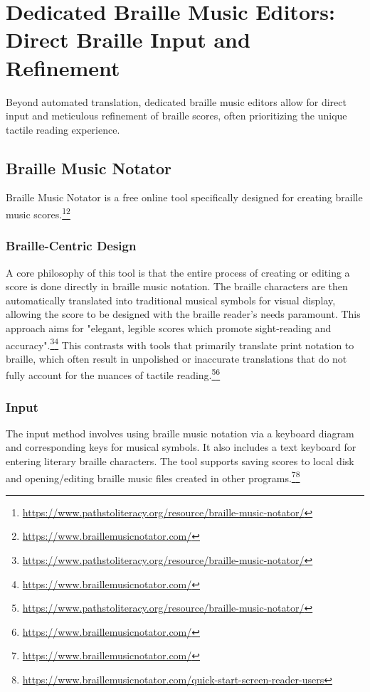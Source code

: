 \section{Dedicated Braille Music Editors: Direct Braille Input and Refinement}

Beyond automated translation, dedicated braille music editors allow for direct input and meticulous refinement of braille scores, often prioritizing the unique tactile reading experience.

\subsection{Braille Music Notator}
Braille Music Notator is a free online tool specifically designed for creating braille music scores.\footnote{\url{https://www.pathstoliteracy.org/resource/braille-music-notator/}}\footnote{\url{https://www.braillemusicnotator.com/}}

\subsubsection{Braille-Centric Design}
A core philosophy of this tool is that the entire process of creating or editing a score is done directly in braille music notation. The braille characters are then automatically translated into traditional musical symbols for visual display, allowing the score to be designed with the braille reader's needs paramount. This approach aims for "elegant, legible scores which promote sight-reading and accuracy".\footnote{\url{https://www.pathstoliteracy.org/resource/braille-music-notator/}}\footnote{\url{https://www.braillemusicnotator.com/}} This contrasts with tools that primarily translate print notation to braille, which often result in unpolished or inaccurate translations that do not fully account for the nuances of tactile reading.\footnote{\url{https://www.pathstoliteracy.org/resource/braille-music-notator/}}\footnote{\url{https://www.braillemusicnotator.com/}}

\subsubsection{Input}
The input method involves using braille music notation via a keyboard diagram and corresponding keys for musical symbols. It also includes a text keyboard for entering literary braille characters. The tool supports saving scores to local disk and opening/editing braille music files created in other programs.\footnote{\url{https://www.braillemusicnotator.com/}}\footnote{\url{https://www.braillemusicnotator.com/quick-start-screen-reader-users}}

